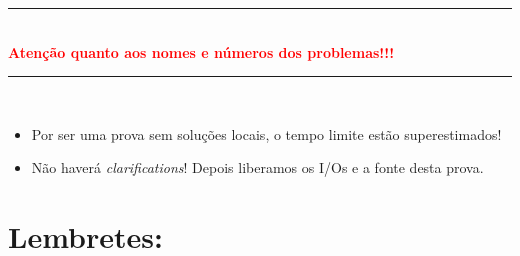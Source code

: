 \documentclass[12pt,oneside]{article}
\begin{document}
\begin{center}
\textcolor{red}{\rule{0.7\paperwidth}{2pt}}\\

\textbf{\textcolor{red}{Atenção quanto aos nomes e números dos problemas!!!}}\\
\textcolor{red}{\rule{0.7\paperwidth}{2pt}}\\
\end{center}

\begin{itemize}

\item Por ser uma prova sem soluções locais, o tempo limite estão superestimados!

\item Não haverá \emph{clarifications}!
Depois liberamos os I/Os e a fonte desta prova.

\end{itemize}

\newpage
\section{Lembretes:}
\end{document}

